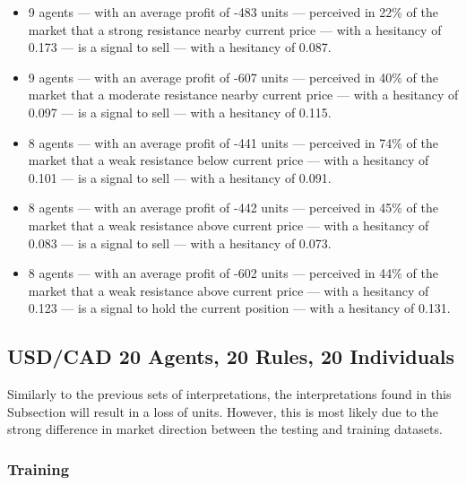 {\small
  \begin{itemize}
  \item 9 agents — with an average profit of -483 units — perceived in 22\% of
    the market that a strong resistance nearby current price — with a hesitancy
    of 0.173 — is a signal to sell — with a hesitancy of 0.087.
  \item 9 agents — with an average profit of -607 units — perceived in 40\% of
    the market that a moderate resistance nearby current price — with a
    hesitancy of 0.097 — is a signal to sell — with a hesitancy of 0.115.
  \item 8 agents — with an average profit of -441 units — perceived in 74\% of
    the market that a weak resistance below current price — with a hesitancy of
    0.101 — is a signal to sell — with a hesitancy of 0.091.
  \item 8 agents — with an average profit of -442 units — perceived in 45\% of
    the market that a weak resistance above current price — with a hesitancy of
    0.083 — is a signal to sell — with a hesitancy of 0.073.
  \item 8 agents — with an average profit of -602 units — perceived in 44\% of
    the market that a weak resistance above current price — with a hesitancy of
    0.123 — is a signal to hold the current position — with a hesitancy of
    0.131.
  \end{itemize}
}

\subsection{USD/CAD 20 Agents, 20 Rules, 20 Individuals}
\label{}

Similarly to the previous sets of interpretations, the interpretations found in
this Subsection will result in a loss of units. However, this is most likely due
to the strong difference in market direction between the testing and training
datasets.

\subsubsection{Training}
\label{}

